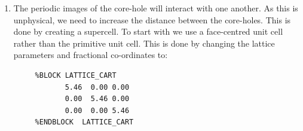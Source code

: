 \documentclass[a4paper,11pt,twoside]{book}
\begin{document}
{\begin{enumerate}
The line 
\begin{verbatim}
    2|1.8|1.8|1.3|2|3|4|30:31:32LGG(qc=4)
\end{verbatim}
specifies the parameters used to create the pseudopotential.  We use this as the starting point and then remove one of the core 1s electrons to create a core-hole pseudopotential.  This is done by including \verb#{1s1.00}# in the pseudopotential string as shown:
\begin{verbatim}
    2|1.8|1.8|1.3|2|3|4|30:31:32LGG{1s1.00}(qc=4)
\end{verbatim}
If, instead of removing a 1s electron, we wanted to remove a 2s electron from the core, we would have included \verb#{2s1.00}# instead of \verb#{1s1.00}# in the pseudopotential string.

We are only interested in the spectra from the atom with the core-hole and so copy the pseudopotential file generated by the previous calculation (\verb#Si_OFT.usp#) to \verb#Si_LDA.usp#.  Then include 
\begin{verbatim}
      %BLOCK SPECIES_POT
            Si:exi    2|1.8|1.8|1.3|2|3|4|30:31:32LGG{1s1.00}(qc=4)
            Si        Si_LDA.usp
      %ENDBLOCK SPECIES_POT
\end{verbatim}
in the \castep\ \verb#Si2_CORE.cell# file.  


To maintain the neutrality of the cell, we include 
\begin{verbatim}
  CHARGE : +1 
\end{verbatim}
in the \verb#Si2_CORE.param# file.  Run the calculation.  This time the \verb#Si2_CORE_core_edge.dat# file will contain only the edges from the core-hole atom.  Compare the K-edge from the core-hole calculation with the previous non-core-hole calculation.  

\item The periodic images of the core-hole will interact with one another.  As this is unphysical, we need to increase the distance between the core-holes.  This is done by creating a supercell.  To start with we use a face-centred unit cell rather than the primitive unit cell.  This is done by changing the lattice parameters and fractional co-ordinates to:
\begin{verbatim} 
     %BLOCK LATTICE_CART 
            5.46  0.00 0.00
            0.00  5.46 0.00
            0.00  0.00 5.46
     %ENDBLOCK  LATTICE_CART


\end{verbatim}
\end{enumerate}}
\end{document}

